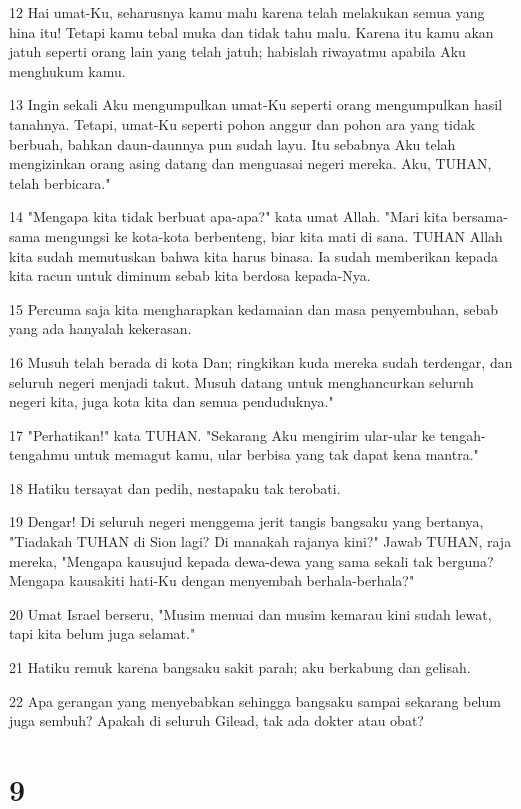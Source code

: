 \par 12 Hai umat-Ku, seharusnya kamu malu karena telah melakukan semua yang hina itu! Tetapi kamu tebal muka dan tidak tahu malu. Karena itu kamu akan jatuh seperti orang lain yang telah jatuh; habislah riwayatmu apabila Aku menghukum kamu.
\par 13 Ingin sekali Aku mengumpulkan umat-Ku seperti orang mengumpulkan hasil tanahnya. Tetapi, umat-Ku seperti pohon anggur dan pohon ara yang tidak berbuah, bahkan daun-daunnya pun sudah layu. Itu sebabnya Aku telah mengizinkan orang asing datang dan menguasai negeri mereka. Aku, TUHAN, telah berbicara."
\par 14 "Mengapa kita tidak berbuat apa-apa?" kata umat Allah. "Mari kita bersama-sama mengungsi ke kota-kota berbenteng, biar kita mati di sana. TUHAN Allah kita sudah memutuskan bahwa kita harus binasa. Ia sudah memberikan kepada kita racun untuk diminum sebab kita berdosa kepada-Nya.
\par 15 Percuma saja kita mengharapkan kedamaian dan masa penyembuhan, sebab yang ada hanyalah kekerasan.
\par 16 Musuh telah berada di kota Dan; ringkikan kuda mereka sudah terdengar, dan seluruh negeri menjadi takut. Musuh datang untuk menghancurkan seluruh negeri kita, juga kota kita dan semua penduduknya."
\par 17 "Perhatikan!" kata TUHAN. "Sekarang Aku mengirim ular-ular ke tengah-tengahmu untuk memagut kamu, ular berbisa yang tak dapat kena mantra."
\par 18 Hatiku tersayat dan pedih, nestapaku tak terobati.
\par 19 Dengar! Di seluruh negeri menggema jerit tangis bangsaku yang bertanya, "Tiadakah TUHAN di Sion lagi? Di manakah rajanya kini?" Jawab TUHAN, raja mereka, "Mengapa kausujud kepada dewa-dewa yang sama sekali tak berguna? Mengapa kausakiti hati-Ku dengan menyembah berhala-berhala?"
\par 20 Umat Israel berseru, "Musim menuai dan musim kemarau kini sudah lewat, tapi kita belum juga selamat."
\par 21 Hatiku remuk karena bangsaku sakit parah; aku berkabung dan gelisah.
\par 22 Apa gerangan yang menyebabkan sehingga bangsaku sampai sekarang belum juga sembuh? Apakah di seluruh Gilead, tak ada dokter atau obat?

\chapter{9}

